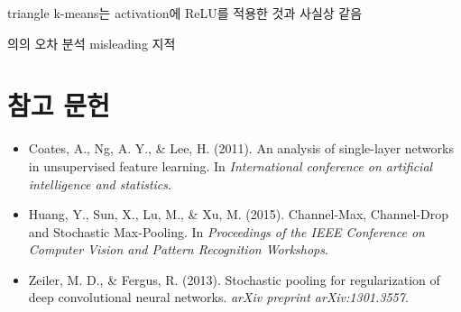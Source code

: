 \documentclass[a4paper,9pt]{article}
\begin{document}
\begin{multicols}{2}
triangle k-means는 activation에 ReLU를 적용한 것과 사실상 같음

의의
오차 분석
misleading 지적

\section*{참고 문헌}

\begin{itemize}
\item Coates, A., Ng, A. Y., \& Lee, H. (2011). An analysis of single-layer networks in unsupervised feature learning. In \textit{International conference on artificial intelligence and statistics}.
\item Huang, Y., Sun, X., Lu, M., \& Xu, M. (2015). Channel-Max, Channel-Drop and Stochastic Max-Pooling. In \textit{Proceedings of the IEEE Conference on Computer Vision and Pattern Recognition Workshops}.
\item Zeiler, M. D., \& Fergus, R. (2013). Stochastic pooling for regularization of deep convolutional neural networks. \textit{arXiv preprint arXiv:1301.3557}.
\end{itemize}

\end{multicols}
\end{document}
